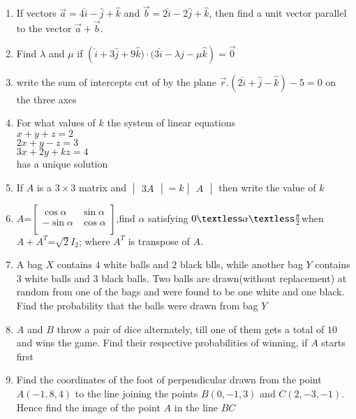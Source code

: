 \documentclass[12pt,-letter paper]{article}
\providecommand{\mydet}[1]{\ensuremath{\begin{vmatrix}#1\end{vmatrix}}}
\providecommand{\myvec}[1]{\ensuremath{\begin{bmatrix}#1\end{bmatrix}}}
\providecommand{\brak}[1]{\ensuremath{\left(#1\right)}}
\begin{document}
\begin{enumerate}
	\item If vectors $\overset{\rightarrow}{a} = 4\hat{i} - \hat{j} + \hat{k}$ and $\overset{\rightarrow}{b} = 2\hat{i} - 2\hat{j} + \hat{k}$, then find a unit vector parallel to the vector $\overset{\rightarrow}{a} + \overset{\rightarrow}{b}$.

 \item Find $\lambda$ and $\mu$ if $\brak{\hat{i} +3\hat{j} + 9\hat{k}) \cdot (3\hat{i} - \lambda \hat{j} - \mu \hat{k}} =\overset\rightarrow 0$
  

 \item  write the sum of intercepts cut of by the plane $\overset{\rightarrow}{r}. \brak{2\hat{i}+\hat{j}-\hat{k}}-5=0$ on the three axes



\item For what values of $k$ the system of linear equations\\
$x+y+z=2$\\
$2x+y-z=3$\\
$3x+2y+kz=4$\\
has a unique solution

\item If $A$ is a $3\times3$ matrix and $\mydet{3A}=k\mydet{A}$ then     write the value of $k$


 \item $A$=$\myvec{\cos\alpha&\sin\alpha\\                           -\sin\alpha&\cos\alpha\\}$,find $\alpha$ satisfying $0\textless\alpha\textless\frac{\pi}{2}$when $A+A^T$=$\sqrt{2}$$I_{2}$; where $A^T$ is     transpose of $A$.

	\item A bag $X$ contains $4$ white balls and $2$ black blls, while another bag $Y$ contains $3$ white balls and $3$ black balls. Two balls are drawn(without replacement) at random from one of the bags and were found to be one white and one black. Find the probability that the balls were drawn from bag $Y$
	
	\item $A$ and $B$ throw a pair of dice alternately, till one of them gets a total of $10$ and wins the game. Find their respective probabilities of winning, if $A$ starts first		


	\item Find the coordinates of the foot of perpendicular drawn from the point $A\brak{-1,8,4}$ to the line joining the points $B\brak{0,-1,3}$ and $C\brak{2,-3,-1}$. Hence find the image of the point $A$ in the line $BC$




\end{enumerate}
\end{document}

